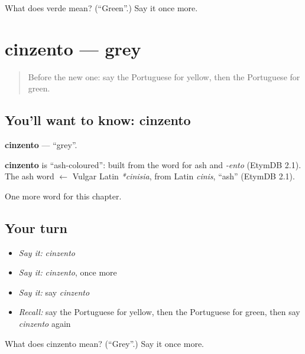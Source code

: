 \begin{tcolorbox}[breakable,colback=teal!4,colframe=teal!35!black,title={Before you move on}]
What does verde mean? (\textquotedblleft{}Green\textquotedblright{}.) Say it once more.
\end{tcolorbox}
\section[cinzento]{cinzento — grey}

\label{lesson:PT-C69-cinzento}



\begin{quote}
Before the new one: say the Portuguese for yellow, then the Portuguese for green.
\end{quote}

\subsection*{You'll want to know: cinzento}
\textbf{cinzento} — \textquotedblleft{}grey\textquotedblright{}.

\begin{cousinweb}
\textbf{cinzento} is \textquotedblleft{}ash-coloured\textquotedblright{}: built from the word for ash and \emph{-ento} (EtymDB 2.1). The ash word $\leftarrow$ Vulgar Latin \emph{*cinisia}, from Latin \emph{cinis}, \textquotedblleft{}ash\textquotedblright{} (EtymDB 2.1).
\end{cousinweb}

\begin{grammarlens}[title={What you've built}]
One more word for this chapter.
\end{grammarlens}

\subsection*{Your turn}
\begin{itemize}
\raggedright
  \item \emph{Say it:} \emph{cinzento}
  \item \emph{Say it:} \emph{cinzento}, once more
  \item \emph{Say it:} say \emph{cinzento}
  \item \emph{Recall:} say the Portuguese for yellow, then the Portuguese for green, then say \emph{cinzento} again
\end{itemize}

\begin{tcolorbox}[breakable,colback=teal!4,colframe=teal!35!black,title={Before you move on}]
What does cinzento mean? (\textquotedblleft{}Grey\textquotedblright{}.) Say it once more.
\end{tcolorbox}
